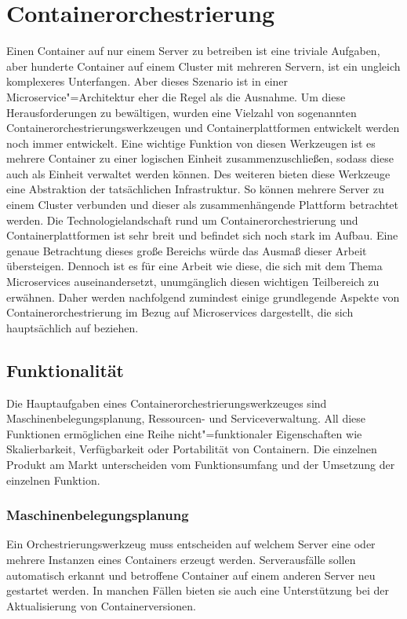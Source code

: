 \section{Containerorchestrierung}

Einen Container auf nur einem Server zu betreiben ist eine triviale Aufgaben, aber hunderte Container auf einem Cluster mit mehreren Servern, ist ein ungleich komplexeres Unterfangen. Aber dieses Szenario ist in einer Microservice"=Architektur eher die Regel als die Ausnahme. Um diese Herausforderungen zu bewältigen, wurden eine Vielzahl von sogenannten Containerorchestrierungswerkzeugen und Containerplattformen entwickelt \bzw werden noch immer entwickelt. Eine wichtige Funktion von diesen Werkzeugen ist es mehrere Container zu einer logischen Einheit zusammenzuschließen, sodass diese auch als Einheit verwaltet werden können. Des weiteren bieten diese Werkzeuge eine Abstraktion der tatsächlichen Infrastruktur. So können mehrere Server zu einem Cluster verbunden und dieser als zusammenhängende Plattform betrachtet werden. Die Technologielandschaft rund um Containerorchestrierung und Containerplattformen ist sehr breit und befindet sich noch stark im Aufbau. Eine genaue Betrachtung dieses große Bereichs würde das Ausmaß dieser Arbeit übersteigen. Dennoch ist es für eine Arbeit wie diese, die sich mit dem Thema Microservices auseinandersetzt, unumgänglich diesen wichtigen Teilbereich zu erwähnen. Daher werden nachfolgend zumindest einige grundlegende Aspekte von Containerorchestrierung im Bezug auf Microservices dargestellt, die sich hauptsächlich auf \cite{ContainerOrcaWars} beziehen. 

\subsection{Funktionalität}

Die Hauptaufgaben eines Containerorchestrierungswerkzeuges sind Maschinenbelegungsplanung, Ressourcen- und Serviceverwaltung. All diese Funktionen ermöglichen eine Reihe nicht"=funktionaler Eigenschaften wie Skalierbarkeit, Verfügbarkeit oder Portabilität von Containern. Die einzelnen Produkt am Markt unterscheiden vom Funktionsumfang und der Umsetzung der einzelnen Funktion.

\subsubsection{Maschinenbelegungsplanung}

Ein Orchestrierungswerkzeug muss entscheiden auf welchem Server eine oder mehrere Instanzen eines Containers erzeugt werden. Serverausfälle sollen automatisch erkannt und betroffene Container auf einem anderen Server neu gestartet werden. In manchen Fällen bieten sie auch eine Unterstützung bei der Aktualisierung von Containerversionen.

